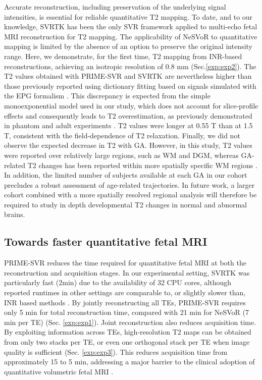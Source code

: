 \documentclass[preprint,authoryear,12pt]{elsarticle}
\begin{document}
Accurate reconstruction, including preservation of the underlying signal intensities, is essential for reliable quantitative T2 mapping. To date, and to our knowledge, SVRTK has been the only SVR framework applied to multi-echo fetal MRI reconstruction for T2 mapping. The applicability of NeSVoR to quantitative mapping is limited by the absence of an option to preserve the original intensity range. Here, we demonstrate, for the first time, T2 mapping from INR-based reconstructions, achieving an isotropic resolution of 0.8 mm (Sec.\ref{exp:exp2}). The T2 values obtained with PRIME-SVR and SVRTK are nevertheless higher than those previously reported using dictionary fitting based on signals simulated with the EPG formalism \citep{bhattacharya_vivo_2024}. This discrepancy is expected from the simple monoexponential model used in our study, which does not account for slice-profile effects and consequently leads to T2 overestimation, as previously demonstrated in phantom and adult experiments \citep{lajous_fetal_2022,roulet_t2_2025}. T2 values were longer at 0.55 T than at 1.5 T, consistent with the field-dependence of T2 relaxation. Finally, we did not observe the expected decrease in T2 with GA. However, in this study, T2 values were reported over relatively large regions, such as WM and DGM, whereas GA-related T2 changes has been reported within more spatially specific WM regions \citep{ge_highfidelity_2026}. In addition, the limited number of subjects available at each GA in our cohort precludes a robust assessment of age-related trajectories. In future work, a larger cohort combined with a more spatially resolved regional analysis will therefore be required to study in depth developmental T2 changes in normal and abnormal brains.



\subsection{Towards faster quantitative fetal MRI}

PRIME-SVR reduces the time required for quantitative fetal MRI at both the reconstruction and acquisition stages. In our experimental setting, SVRTK was particularly fast (2min) due to the availability of 32 CPU cores, although reported runtimes in other settings are comparable to, or slightly slower than, INR based methods \citep{dannecker2026fast}. By jointly reconstructing all TEs, PRIME-SVR requires only 5 min for total reconstruction time, compared with 21 min for NeSVoR (7 min per TE) (Sec. \ref{exp:exp1}). Joint reconstruction also reduces acquisition time. By exploiting information across TEs, high-resolution T2 maps can be obtained from only two stacks per TE, or even one orthogonal stack per TE when image quality is sufficient (Sec. \ref{exp:exp3}). This reduces acquisition time from approximately 15 to 5 min, addressing a major barrier to the clinical adoption of quantitative volumetric fetal MRI \citep{bhattacharya_vivo_2024}.
\end{document}
